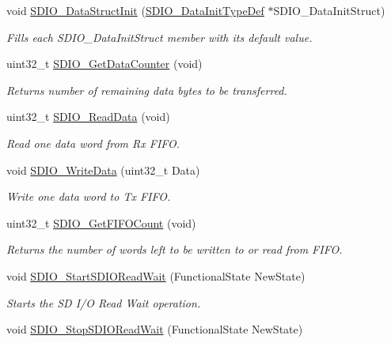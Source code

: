 \begin{DoxyCompactItemize}
void \hyperlink{group___s_d_i_o_gaa83209c09e921521aca2587fb5b22ea2}{S\-D\-I\-O\-\_\-\-Data\-Struct\-Init} (\hyperlink{struct_s_d_i_o___data_init_type_def}{S\-D\-I\-O\-\_\-\-Data\-Init\-Type\-Def} $\ast$S\-D\-I\-O\-\_\-\-Data\-Init\-Struct)
\begin{DoxyCompactList}\small\item\em Fills each S\-D\-I\-O\-\_\-\-Data\-Init\-Struct member with its default value. \end{DoxyCompactList}\item 
uint32\-\_\-t \hyperlink{group___s_d_i_o_ga7a28aaa2c25a9a5a8db1f49b0e8c9d0a}{S\-D\-I\-O\-\_\-\-Get\-Data\-Counter} (void)
\begin{DoxyCompactList}\small\item\em Returns number of remaining data bytes to be transferred. \end{DoxyCompactList}\item 
uint32\-\_\-t \hyperlink{group___s_d_i_o_ga4e8ac755ef3c31ecd4ed2708df19187e}{S\-D\-I\-O\-\_\-\-Read\-Data} (void)
\begin{DoxyCompactList}\small\item\em Read one data word from Rx F\-I\-F\-O. \end{DoxyCompactList}\item 
void \hyperlink{group___s_d_i_o_ga361008b5252aa33b5f2b5823ee3d7240}{S\-D\-I\-O\-\_\-\-Write\-Data} (uint32\-\_\-t Data)
\begin{DoxyCompactList}\small\item\em Write one data word to Tx F\-I\-F\-O. \end{DoxyCompactList}\item 
uint32\-\_\-t \hyperlink{group___s_d_i_o_ga9a3343983a2d68b5164a1c89797d2dd6}{S\-D\-I\-O\-\_\-\-Get\-F\-I\-F\-O\-Count} (void)
\begin{DoxyCompactList}\small\item\em Returns the number of words left to be written to or read from F\-I\-F\-O. \end{DoxyCompactList}\item 
void \hyperlink{group___s_d_i_o_gac88f914d9a68a83abc2265ec8a7b79fc}{S\-D\-I\-O\-\_\-\-Start\-S\-D\-I\-O\-Read\-Wait} (Functional\-State New\-State)
\begin{DoxyCompactList}\small\item\em Starts the S\-D I/\-O Read Wait operation. \end{DoxyCompactList}\item 
void \hyperlink{group___s_d_i_o_gaca6b25eb2debb73ac827c66f0ebcf837}{S\-D\-I\-O\-\_\-\-Stop\-S\-D\-I\-O\-Read\-Wait} (Functional\-State New\-State)

\end{DoxyCompactItemize}

